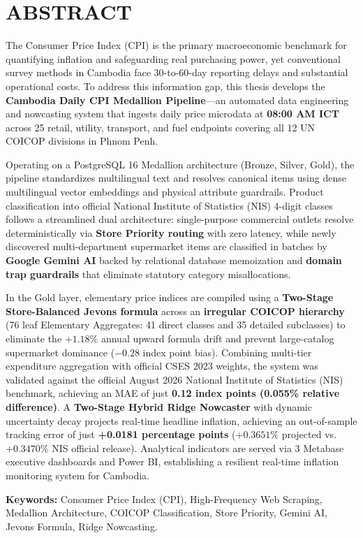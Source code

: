 \chapter*{\centering ABSTRACT}

\hs The Consumer Price Index (CPI) is the primary macroeconomic benchmark for quantifying inflation and safeguarding real purchasing power, yet conventional survey methods in Cambodia face 30-to-60-day reporting delays and substantial operational costs. To address this information gap, this thesis develops the \textbf{Cambodia Daily CPI Medallion Pipeline}---an automated data engineering and nowcasting system that ingests daily price microdata at \textbf{08:00 AM ICT} across 25 retail, utility, transport, and fuel endpoints covering all 12 UN COICOP divisions in Phnom Penh.

\hs Operating on a PostgreSQL 16 Medallion architecture (Bronze, Silver, Gold), the pipeline standardizes multilingual text and resolves canonical items using dense multilingual vector embeddings and physical attribute guardrails. Product classification into official National Institute of Statistics (NIS) 4-digit classes follows a streamlined dual architecture: single-purpose commercial outlets resolve deterministically via \textbf{Store Priority routing} with zero latency, while newly discovered multi-department supermarket items are classified in batches by \textbf{Google Gemini AI} backed by relational database memoization and \textbf{domain trap guardrails} that eliminate statutory category misallocations.

\hs In the Gold layer, elementary price indices are compiled using a \textbf{Two-Stage Store-Balanced Jevons formula} across an \textbf{irregular COICOP hierarchy} (76 leaf Elementary Aggregates: 41 direct classes and 35 detailed subclasses) to eliminate the $+1.18\%$ annual upward formula drift and prevent large-catalog supermarket dominance ($-0.28$ index point bias). Combining multi-tier expenditure aggregation with official CSES 2023 weights, the system was validated against the official August 2026 National Institute of Statistics (NIS) benchmark, achieving an MAE of just \textbf{0.12 index points (0.055\% relative difference)}. A \textbf{Two-Stage Hybrid Ridge Nowcaster} with dynamic uncertainty decay projects real-time headline inflation, achieving an out-of-sample tracking error of just \textbf{+0.0181 percentage points} ($+0.3651\%$ projected vs. $+0.3470\%$ NIS official release). Analytical indicators are served via 3 Metabase executive dashboards and Power BI, establishing a resilient real-time inflation monitoring system for Cambodia.

\vspace{0.6cm}
\noindent \textbf{Keywords:} Consumer Price Index (CPI), High-Frequency Web Scraping, Medallion Architecture, COICOP Classification, Store Priority, Gemini AI, Jevons Formula, Ridge Nowcasting.
